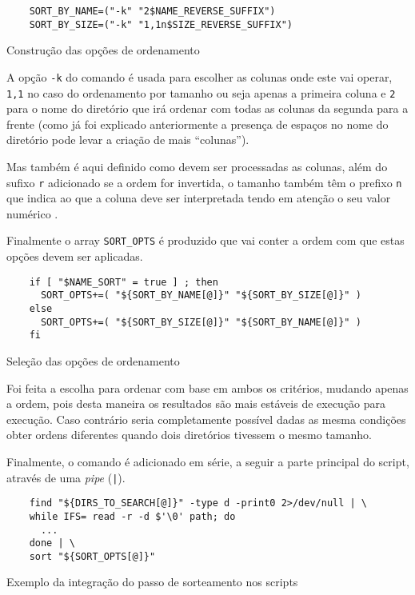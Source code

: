 \begin{listing}[H]
	\centering
	\begin{verbatim}
    SORT_BY_NAME=("-k" "2$NAME_REVERSE_SUFFIX")
    SORT_BY_SIZE=("-k" "1,1n$SIZE_REVERSE_SUFFIX")
  \end{verbatim}
	\caption{Construção das opções de ordenamento}
	\label{code:implementation_sort_fields}
\end{listing}

A opção \Verb|-k| do comando  é usada para escolher as colunas
onde este vai operar, \Verb|1,1| no caso do ordenamento por tamanho ou seja apenas
a primeira coluna e \Verb|2| para o nome do diretório que irá ordenar com todas
as colunas da segunda para a frente (como já foi explicado anteriormente a
presença de espaços no nome do diretório pode levar a criação de mais
\enquote{colunas}).

Mas também é aqui definido como devem ser processadas as colunas, além do sufixo
\Verb|r| adicionado se a ordem for invertida, o tamanho também têm o prefixo
\Verb|n| que indica ao  que a coluna deve ser interpretada
tendo em atenção o seu valor numérico \cite[3248]{posix}.

Finalmente o array \Verb|SORT_OPTS| é produzido que vai conter a ordem com que
estas opções devem ser aplicadas.

\begin{listing}[H]
	\centering
	\begin{verbatim}
    if [ "$NAME_SORT" = true ] ; then
      SORT_OPTS+=( "${SORT_BY_NAME[@]}" "${SORT_BY_SIZE[@]}" )
    else
      SORT_OPTS+=( "${SORT_BY_SIZE[@]}" "${SORT_BY_NAME[@]}" )
    fi
  \end{verbatim}
	\caption{Seleção das opções de ordenamento}
\end{listing}

Foi feita a escolha para ordenar com base em ambos os critérios, mudando apenas
a ordem, pois desta maneira os resultados são mais estáveis de execução para
execução. Caso contrário seria completamente possível dadas as mesma condições
obter ordens diferentes quando dois diretórios tivessem o mesmo tamanho.

Finalmente, o comando  é adicionado em série, a seguir a parte
principal do script, através de uma \emph{pipe} (\Verb_|_).

\begin{listing}[H]
	\centering
	\begin{verbatim}
    find "${DIRS_TO_SEARCH[@]}" -type d -print0 2>/dev/null | \
    while IFS= read -r -d $'\0' path; do
      ...
    done | \
    sort "${SORT_OPTS[@]}"
  \end{verbatim}
	\caption{Exemplo da integração do passo de sorteamento nos scripts}
\end{listing}


